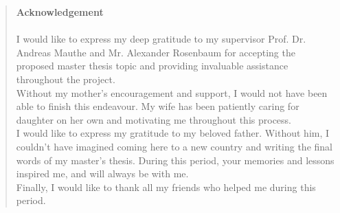 
\pagestyle{plain}


\begin{quote}
	\textbf{\Large Acknowledgement}\\\\
I would like to express my deep gratitude to my supervisor Prof$.$ Dr$.$ Andreas Mauthe and Mr$.$ Alexander Rosenbaum for accepting the proposed master thesis topic and providing invaluable assistance throughout the project. \\
Without my mother's encouragement and support, I would not have been able to finish this endeavour. My wife has been patiently caring for daughter on her own and motivating me throughout this process. \\
I would like to express my gratitude to my beloved father. Without him, I couldn't have imagined coming here to a new country and writing the final words of my master's thesis. During this period, your memories and lessons inspired me, and will always be with me. \\
Finally, I would like to thank all my friends who helped me during this period.
 \end{quote}
